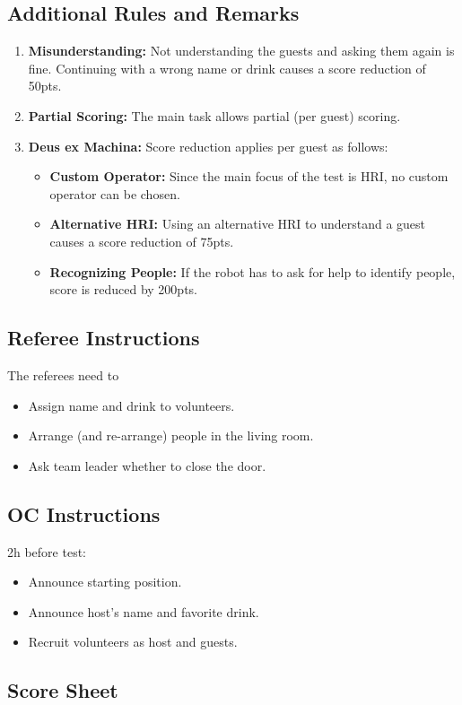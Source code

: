 \subsection*{Additional Rules and Remarks}
\begin{enumerate}[nosep]
	\item \textbf{Misunderstanding:} Not understanding the guests and asking them again is fine. Continuing with a wrong name or drink causes a score reduction of 50pts.
		
	\item \textbf{Partial Scoring:} The main task allows partial (per guest) scoring.
	
	\item \textbf{Deus ex Machina:} Score reduction applies per guest as follows:
	\begin{itemize}[nosep]
		\item \textbf{Custom Operator:} Since the main focus of the test is HRI, no custom operator can be chosen.
		\item \textbf{Alternative HRI:} Using an alternative HRI to understand a guest causes a score reduction of 75pts.
		\item \textbf{Recognizing People:} If the robot has to ask for help to identify people, score is reduced by 200pts. 
	\end{itemize}
\end{enumerate}

\newpage

\subsection*{Referee Instructions}

The referees need to
\begin{itemize}
	\item Assign name and drink to volunteers.
	\item Arrange (and re-arrange) people in the living room.
	\item Ask team leader whether to close the door.
\end{itemize}

\subsection*{OC Instructions}

2h before test:
\begin{itemize}
	\item Announce starting position.
	\item Announce host's name and favorite drink.
	\item Recruit volunteers as host and guests.
\end{itemize}

\subsection*{Score Sheet}


